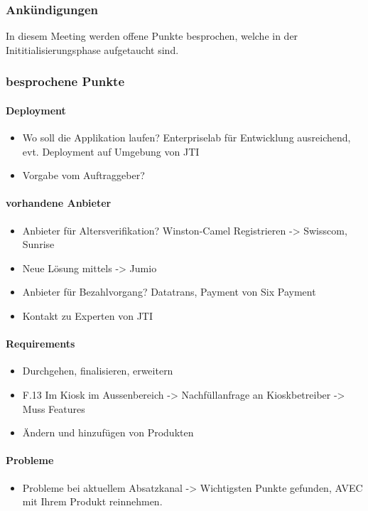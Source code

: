\subsubsection{Ankündigungen}
In diesem Meeting werden offene Punkte besprochen, welche in der Inititialisierungsphase aufgetaucht sind. 
\subsubsection{besprochene Punkte}
\paragraph{Deployment}
\begin{itemize}
	\item Wo soll die Applikation laufen? Enterpriselab für Entwicklung ausreichend, evt. Deployment auf Umgebung von JTI
	\item Vorgabe vom Auftraggeber? 
\end{itemize}
\paragraph{vorhandene Anbieter}
\begin{itemize}
	\item Anbieter für Altersverifikation? Winston-Camel Registrieren -> Swisscom, Sunrise
	\item Neue Lösung mittels -> Jumio
	\item Anbieter für Bezahlvorgang? Datatrans, Payment von Six Payment 
	\item Kontakt zu Experten von JTI
\end{itemize}
\paragraph{Requirements}
\begin{itemize}
	\item Durchgehen, finalisieren, erweitern
	\item F.13 Im Kiosk im Aussenbereich -> Nachfüllanfrage an Kioskbetreiber -> Muss Features
	\item Ändern und hinzufügen von Produkten
\end{itemize}
\paragraph{Probleme}
	\begin{itemize}
	\item Probleme bei aktuellem Absatzkanal -> Wichtigsten Punkte gefunden, AVEC mit Ihrem Produkt reinnehmen. 
	\end{itemize}

